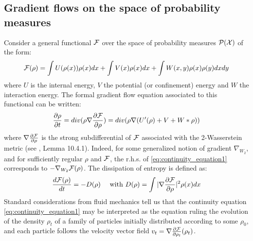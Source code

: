 \subsection{Gradient flows on the space of probability measures}\label{subsec:gradient_flows_functionals}


Consider a 
general functional ${{\mathcal F}}$ over the space of probability measures $\mathcal{P}({{\mathcal X}})$ of the form:
\begin{equation}\label{eq:lyapunov}
{{\mathcal F}}(\rho)=\int U(\rho(x)) \rho(x)dx + \int V(x)\rho(x)dx + \int W(x,y)\rho(x)\rho(y)dxdy
\end{equation}
where  $U$ is the internal energy, $V$ the potential (or confinement) energy and $W$ the
interaction energy. The formal gradient flow equation associated to this functional can be written:
\begin{equation}\label{eq:continuity_equation1}
\frac{\partial \rho}{\partial t}= div( \rho \nabla \frac{\partial {{\mathcal F}}}{\partial \rho})=div( \rho \nabla (U'(\rho) + V + W * \rho))
\end{equation}
where $\nabla \frac{\partial {{\mathcal F}}}{\partial \rho}$ is the strong subdifferential of ${{\mathcal F}}$ associated with the 2-Wasserstein
metric (see \cite{ambrosio2008gradient}, Lemma 10.4.1). Indeed, for some generalized notion of gradient $\nabla_{W_2}$, and for sufficiently regular $\rho$ and ${{\mathcal F}}$, the r.h.s. of \eqref{eq:continuity_equation1} corresponds to $-\nabla_{W_2}{{\mathcal F}}(\rho)$.
The dissipation of entropy is defined as: 
\begin{align}
       \frac{d {{\mathcal F}}(\rho)}{dt} =-D(\rho) \quad \text{ with } D(\rho)= \int |\nabla \frac{\partial {{\mathcal F}}}{\partial \rho}|^2 \rho(x)dx
\end{align}
Standard considerations from fluid mechanics tell us that the continuity equation \eqref{eq:continuity_equation1} may be interpreted as the equation ruling the evolution of the density $\rho_t$ of a family of particles initially distributed according to some $\rho_0$, and each particle follows the velocity vector field $v_t=\nabla \frac{\partial{{{\mathcal F}}}}{\partial{\rho_t}}(\rho_t)$.

